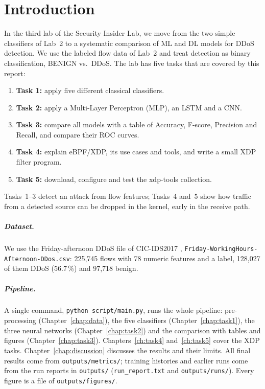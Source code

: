 \chapter{Introduction}\label{chap:introduction}

In the third lab of the Security Insider Lab, we move from the two simple classifiers of Lab~2 to a systematic comparison of ML and DL models for DDoS detection. We use the labeled flow data of Lab~2 and treat detection as binary classification, BENIGN vs.\ DDoS. The lab has five tasks that are covered by this report:

\begin{enumerate}\setlength\itemsep{0pt}
	\item \textbf{Task 1:} apply five different classical classifiers.
	\item \textbf{Task 2:} apply a Multi-Layer Perceptron (MLP), an LSTM and a CNN.
	\item \textbf{Task 3:} compare all models with a table of Accuracy, F-score, Precision and Recall, and compare their ROC curves.
	\item \textbf{Task 4:} explain eBPF/XDP, its use cases and tools, and write a small XDP filter program.
	\item \textbf{Task 5:} download, configure and test the xdp-tools collection.
\end{enumerate}
Tasks~1--3 detect an attack from flow features; Tasks~4 and~5 show how traffic from a detected source can be dropped in the kernel, early in the receive path.

\paragraph{Dataset.} We use the Friday-afternoon DDoS file of CIC-IDS2017 \cite{sharafaldin2018cicids}, \texttt{Friday-WorkingHours-Afternoon-DDos.csv}: 225,745 flows with 78 numeric features and a label, 128,027 of them DDoS (56.7\,\%) and 97,718 benign.

\paragraph{Pipeline.} A single command, \texttt{python script/main.py}, runs the whole pipeline: pre-processing (Chapter~\ref{chap:data}), the five classifiers (Chapter~\ref{chap:task1}), the three neural networks (Chapter~\ref{chap:task2}) and the comparison with tables and figures (Chapter~\ref{chap:task3}). Chapters~\ref{ch:task4} and~\ref{ch:task5} cover the XDP tasks. Chapter~\ref{chap:discussion} discusses the results and their limits. All final results come from \texttt{outputs/metrics/}; training histories and earlier runs come from the run reports in \texttt{outputs/} (\texttt{run\_report.txt} and \texttt{outputs/runs/}). Every figure is a file of \texttt{outputs/figures/}.

